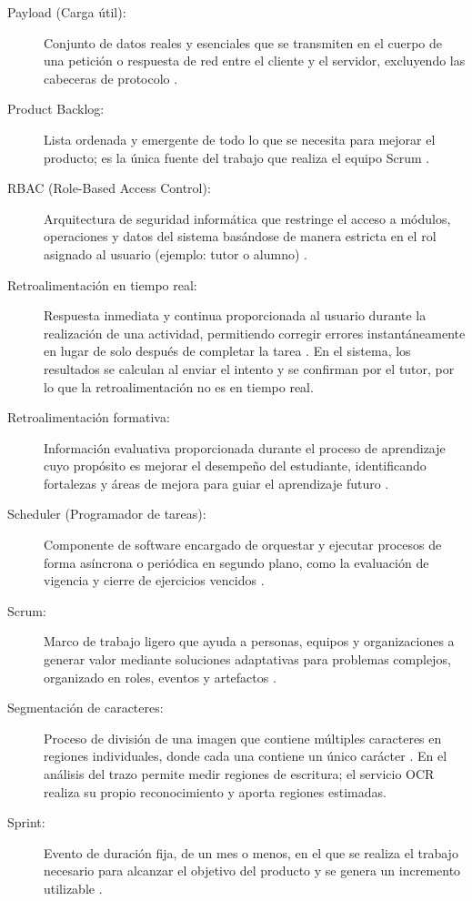 \documentclass[12pt]{article}
\begin{document}
\begin{description}
    \item[Payload (Carga útil):] Conjunto de datos reales y esenciales que se transmiten en el cuerpo de una petición o respuesta de red entre el cliente y el servidor, excluyendo las cabeceras de protocolo \cite{rfc9110}.
    \item[Product Backlog:] Lista ordenada y emergente de todo lo que se necesita para mejorar el producto; es la única fuente del trabajo que realiza el equipo Scrum \cite{schwaber2020scrum}.
    \item[RBAC (Role-Based Access Control):] Arquitectura de seguridad informática que restringe el acceso a módulos, operaciones y datos del sistema basándose de manera estricta en el rol asignado al usuario (ejemplo: tutor o alumno) \cite{sandhu1996rbac}.
    \item[Retroalimentación en tiempo real:] Respuesta inmediata y continua proporcionada al usuario durante la realización de una actividad, permitiendo corregir errores instantáneamente en lugar de solo después de completar la tarea \cite{hattie2007feedback, shute2008formative}. En el sistema, los resultados se calculan al enviar el intento y se confirman por el tutor, por lo que la retroalimentación no es en tiempo real.
    \item[Retroalimentación formativa:] Información evaluativa proporcionada durante el proceso de aprendizaje cuyo propósito es mejorar el desempeño del estudiante, identificando fortalezas y áreas de mejora para guiar el aprendizaje futuro \cite{shute2008formative}.
    \item[Scheduler (Programador de tareas):] Componente de software encargado de orquestar y ejecutar procesos de forma asíncrona o periódica en segundo plano, como la evaluación de vigencia y cierre de ejercicios vencidos \cite{silberschatz2018os}.
    \item[Scrum:] Marco de trabajo ligero que ayuda a personas, equipos y organizaciones a generar valor mediante soluciones adaptativas para problemas complejos, organizado en roles, eventos y artefactos \cite{schwaber2020scrum}.
    \item[Segmentación de caracteres:] Proceso de división de una imagen que contiene múltiples caracteres en regiones individuales, donde cada una contiene un único carácter \cite{casey1996segmentation}. En el análisis del trazo permite medir regiones de escritura; el servicio OCR realiza su propio reconocimiento y aporta regiones estimadas.
    \item[Sprint:] Evento de duración fija, de un mes o menos, en el que se realiza el trabajo necesario para alcanzar el objetivo del producto y se genera un incremento utilizable \cite{schwaber2020scrum}.

\end{description}
\end{document}
